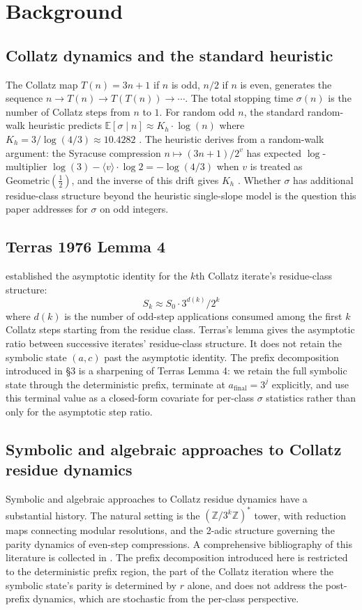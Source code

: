 \documentclass[pdflatex,sn-mathphys-num]{sn-jnl}
\theoremstyle{thmstyleone}%
\theoremstyle{definition}
\theoremstyle{plain}
\begin{document}
\section{Background}
\label{sec:background}
\subsection{Collatz dynamics and the standard heuristic}
The Collatz map $T(n) = 3n + 1$ if $n$ is odd, $n/2$ if $n$ is even, generates the sequence $n \to T(n) \to T(T(n)) \to \cdots$. The total stopping time $\sigma(n)$ is the number of Collatz steps from $n$ to $1$. For random odd $n$, the standard random-walk heuristic predicts $\mathbb{E}[\sigma \mid n] \approx K_h \cdot \log(n)$ where $K_h = 3/ \log(4/3) \approx 10.4282$ \cite{lagarias1985}. The heuristic derives from a random-walk argument: the Syracuse compression $n \mapsto (3n + 1)/2^v$ has expected $\log$-multiplier $\log(3) - \langle v \rangle \cdot \log 2 = - \log(4/3)$ when $v$ is treated as $\text{Geometric}(\frac{1}{2})$, and the inverse of this drift gives $K_h$ \citep{lagarias2010, sinai2003}. Whether $\sigma$ has additional residue-class structure beyond the heuristic single-slope model is the question this paper addresses for $\sigma$ on odd integers.

\subsection{Terras 1976 Lemma 4}
\citet{terras1976} established the asymptotic identity for the $k$th Collatz iterate's residue-class structure: $$S_k \approx S_0 \cdot 3^{d(k)}/2^k$$ where $d(k)$ is the number of odd-step applications consumed among the first $k$ Collatz steps starting from the residue class. Terras's lemma gives the asymptotic ratio between successive iterates' residue-class structure. It does not retain the symbolic state $(a, c)$ past the asymptotic identity. The prefix decomposition introduced in \S3 is a sharpening of Terras Lemma 4: we retain the full symbolic state through the deterministic prefix, terminate at $a_{\text{final}} = 3^j$ explicitly, and use this terminal value as a closed-form covariate for per-class $\sigma$ statistics rather than only for the asymptotic step ratio.

\subsection{Symbolic and algebraic approaches to Collatz residue dynamics}
Symbolic and algebraic approaches to Collatz residue dynamics have a substantial history. The natural setting is the $(\mathbb{Z}/3^k\mathbb{Z})^*$ tower, with reduction maps connecting modular resolutions, and the 2-adic structure governing the parity dynamics of even-step compressions. A comprehensive bibliography of this literature is collected in \citet{lagarias2010}. The prefix decomposition introduced here is restricted to the deterministic prefix region, the part of the Collatz iteration where the symbolic state's parity is determined by $r$ alone, and does not address the post-prefix dynamics, which are stochastic from the per-class perspective.
\end{document}
